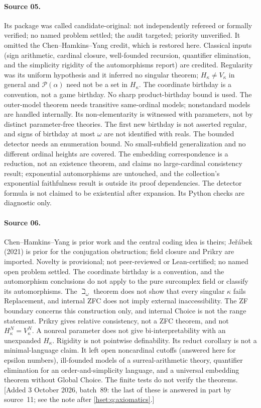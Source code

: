 \documentclass[11pt,letterpaper]{article}
\theoremstyle{definition}
\theoremstyle{remark}
\newcommand{\Pow}{\mathcal P}
\begin{document}
\paragraph{Source 05.}
Its package was called candidate-original: not independently refereed or
formally verified; no named problem settled; the audit targeted; priority
unverified. It omitted the Chen--Hamkins--Yang credit, which is restored here.
Classical inputs (sign arithmetic, cardinal closure, well-founded recursion,
quantifier elimination, and the simplicity rigidity of the automorphisms report)
are credited. Regularity was its uniform hypothesis and it inferred no singular
theorem; $H_\kappa\ne V_\kappa$ in general and $\Pow(\alpha)$ need not be a set in
$H_\kappa$. The coordinate birthday is a convention, not a game birthday. No
sharp product-birthday bound is used. The outer-model theorem needs transitive
same-ordinal models; nonstandard models are handled internally. Its
non-elementarity is witnessed with parameters, not by distinct parameter-free
theories. The first new birthday is not asserted regular, and signs of birthday
at most $\omega$ are not identified with reals. The bounded detector needs an
enumeration bound. No small-subfield generalization and no different ordinal
heights are covered. The embedding correspondence is a reduction, not an
existence theorem, and claims no large-cardinal consistency result; exponential
automorphisms are untouched, and the collection's exponential faithfulness
result is outside its proof dependencies. The detector formula is not claimed to
be existential after expansion. Its Python checks are diagnostic only.

\paragraph{Source 06.}
Chen--Hamkins--Yang is prior work and the central coding idea is theirs;
Je\v{r}\'abek (2021) is prior for the conjugation obstruction; field closure and
Prikry are imported. Novelty is provisional; not peer-reviewed or Lean-certified;
no named open problem settled. The coordinate birthday is a convention, and the
automorphism conclusions do not apply to the pure surcomplex field or classify
its automorphisms. The $\beth_\omega$ theorem does not show that every singular
$\kappa$ fails Replacement, and internal ZFC does not imply external
inaccessibility. The ZF boundary concerns this construction only, and internal
Choice is not the range statement. Prikry gives relative consistency, not a ZFC
theorem, and not $H_\kappa^N=V_\kappa^N$. A nonreal parameter does not give
bi-interpretability with an unexpanded $H_\kappa$. Rigidity is not pointwise
definability. Its reduct corollary is not a minimal-language claim. It left open
noncardinal cutoffs (answered here for epsilon numbers), ill-founded models of a
surreal-arithmetic theory, quantifier elimination for an order-and-simplicity
language, and a universal embedding theorem without Global Choice. The finite
tests do not verify the theorems.
[Added 3 October 2026, batch~89: the last of these is answered in part by
source~11; see the note after \cref{hset:q:axiomatics}.]
\end{document}
